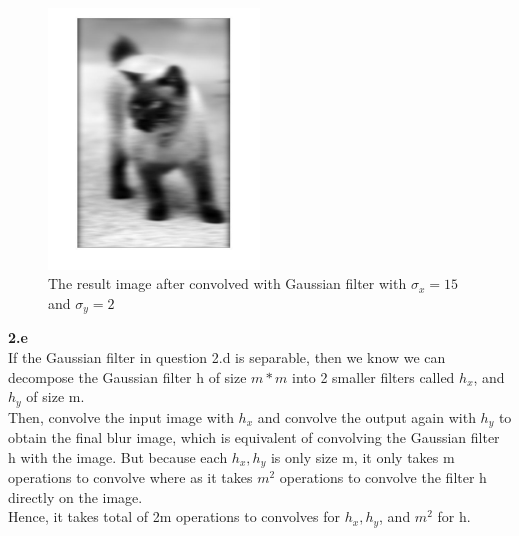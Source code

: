 \documentclass[11pt]{article}
\begin{document}
\begin{figure}[h]
  \caption{The result image after convolved with Gaussian filter with $\sigma_x = 15$
and $\sigma_y = 2$ }
  \centering
    \includegraphics[width=0.5\textwidth]{2d}
\end{figure}




\noindent
\textbf{2.e} \\
If the Gaussian filter in question 2.d is separable, then we know we can decompose the Gaussian filter h of size $m*m$ into 2 smaller filters called $h_x$, and $h_y$ of size m. \\

\noindent
Then, convolve the input image with $h_x$ and convolve the output again with $h_y$ to obtain the final blur image, which is equivalent  of convolving the Gaussian filter h with the image. But because each $h_x, h_y$ is only size m, it only takes m operations to convolve where as it takes $m^2$ operations to convolve the filter h directly on the image.\\  

\noindent
Hence, it takes total of 2m operations to convolves for $h_x, h_y$, and $m^2$ for h.\\
\end{document}
